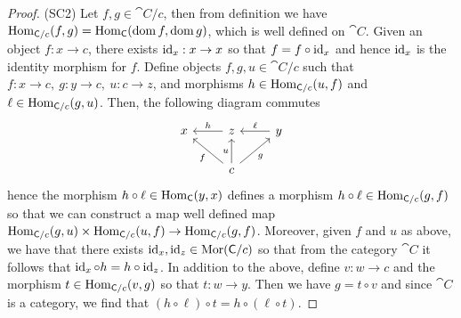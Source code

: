 \begin{proof}
  (SC2) Let \(f, g \in \cat C/c\), then from definition we have \(\operatorname{Hom}_{\mathsf
  C/c}(f, g) = \operatorname{Hom}_{\mathsf C}(\operatorname{dom} f, \operatorname{dom} g)\), which is well defined on \(\cat
  C\). Given an object \(f: x \to c\), there exists \(\operatorname{id}_x: x \to x\) so that
  \(f = f \circ \operatorname{id}_x\) and hence \(\operatorname{id}_x\) is the identity morphism for \(f\).
  Define objects \(f, g, u \in \cat C/c\) such that \(f: x \to c,\ g: y \to c,\
  u: c \to z\), and morphisms \(h \in \operatorname{Hom}_{\mathsf C/c}(u, f)\) and \(\ell \in
  \operatorname{Hom}_{\mathsf C/c}(g, u)\). Then, the following diagram commutes 
   \[
    \begin{tikzcd}
      x
        &z \ar[l, swap, "h"]
          &y \ar[l, swap, "\ell"] \\
        &c \ar[lu, "f"] \ar[u, "u"] \ar[ru, swap, "g"]
    \end{tikzcd}
  \] 
  hence the morphism \(h \circ \ell \in \operatorname{Hom}_{\mathsf C}(y, x)\) defines a morphism
  \(h \circ \ell \in \operatorname{Hom}_{\mathsf C/c}(g, f)\) so that we can construct a map well
  defined map \(\operatorname{Hom}_{\mathsf C/c}(g, u) \times \operatorname{Hom}_{\mathsf C/c}(u, f) \to
  \operatorname{Hom}_{\mathsf C/c}(g, f)\). Moreover, given \(f\) and \(u\) as above, we have
  that there exists \(\operatorname{id}_x, \operatorname{id}_z \in \operatorname{Mor}(\mathsf C/c)\) so that from the
  category \(\cat C\) it follows that \(\operatorname{id}_x \circ h = h \circ \operatorname{id}_z\). In
  addition to the above, define \(v: w \to c\) and the morphism \(t \in
  \operatorname{Hom}_{\mathsf C/c}(v, g)\) so that \(t: w \to y\). Then we have \(g = t \circ v\) 
  and since \(\cat C\) is a category, we find that \((h \circ \ell) \circ t = h
  \circ (\ell \circ t)\).
\end{proof}
